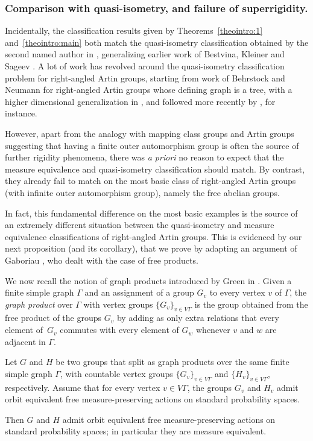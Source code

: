 \subsubsection*{Comparison with quasi-isometry, and failure of superrigidity.} Incidentally, the classification results given by Theorems~\ref{theointro:1} and~\ref{theointro:main} both match the quasi-isometry classification obtained by the second named author in \cite{Hua}, generalizing earlier work of Bestvina, Kleiner and Sageev \cite{BKS}. A lot of work has revolved around the quasi-isometry classification problem for right-angled Artin groups, starting from work of Behrstock and Neumann \cite{behrstock2008quasi} for right-angled Artin groups whose defining graph is a tree, with a higher dimensional generalization in \cite{behrstock2010quasi}, and followed more recently by \cite{Hua4,Mar}, for instance.

However, apart from the analogy with mapping class groups and Artin groups suggesting that having a finite outer automorphism group is often the source of further rigidity phenomena, there was \emph{a priori} no reason to expect that the measure equivalence and quasi-isometry classification should match. By contrast, they already fail to match on the most basic class of right-angled Artin groups (with infinite outer automorphism group), namely the free abelian groups.

In fact, this fundamental difference on the most basic examples is the source of an extremely different situation between the quasi-isometry and measure equivalence classifications of right-angled Artin groups. This is evidenced by our next proposition (and its corollary), that we prove by adapting an argument of Gaboriau \cite{Gab-cost,Gab}, who dealt with the case of free products.

We now recall the notion of graph products introduced by Green in \cite{green1990graph}. Given a finite simple graph $\Gamma$ and an assignment of a group $G_v$ to every vertex $v$ of $\Gamma$, the \emph{graph product} over $\Gamma$ with vertex groups $\{G_v\}_{v\in V\Gamma}$ is the group obtained from the free product of the groups $G_v$ by adding as only extra relations that every element of~$G_v$ commutes with every element of $G_w$ whenever $v$ and $w$ are adjacent in $\Gamma$.

\begin{propintro}\label{propintro:graph-products}
Let $G$ and $H$ be two groups that split as graph products over the same finite simple graph $\Gamma$, with countable vertex groups $\{G_v\}_{v\in V\Gamma}$ and $\{H_v\}_{v\in V\Gamma}$, respectively. Assume that for every vertex $v\in V\Gamma$, the groups $G_v$ and $H_v$ admit orbit equivalent free measure-preserving actions on standard probability spaces.

Then $G$ and $H$ admit orbit equivalent free measure-preserving actions on standard probability spaces; in particular they are measure equivalent.
\end{propintro}

